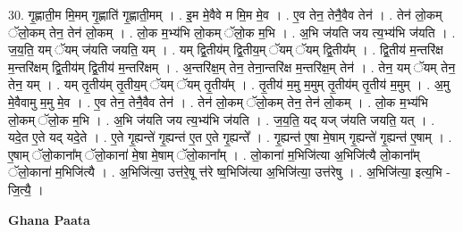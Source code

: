\documentclass[17pt]{extarticle}
\begin{document}
30. गृ॒ह्णाती॒म मि॒मम् गृ॒ह्णाति॑ गृ॒ह्णाती॒मम् । . इ॒म मे॒वैवे म मि॒म मे॒व । . ए॒व तेन॒ तेनै॒वैव तेन॑ । . तेन॑ लो॒कम् ॅलो॒कम् तेन॒ तेन॑ लो॒कम् । . लो॒क म॒भ्य॑भि लो॒कम् ॅलो॒क म॒भि । . अ॒भि ज॑यति जय त्य॒भ्य॑भि ज॑यति । . ज॒य॒ति॒ यम् ॅयम् ज॑यति जयति॒ यम् । . यम् द्वि॒तीय॑म् द्वि॒तीय॒म् ॅयम् ॅयम् द्वि॒तीय᳚म् । . द्वि॒तीय॑ म॒न्तरि॑क्ष म॒न्तरि॑क्षम् द्वि॒तीय॑म् द्वि॒तीय॑ म॒न्तरि॑क्षम् । . अ॒न्तरि॑क्ष॒म् तेन॒ तेना॒न्तरि॑क्ष म॒न्तरि॑क्ष॒म् तेन॑ । . तेन॒ यम् ॅयम् तेन॒ तेन॒ यम् । . यम् तृ॒तीय॑म् तृ॒तीय॒म् ॅयम् ॅयम् तृ॒तीय᳚म् । . तृ॒तीय॑ म॒मु म॒मुम् तृ॒तीय॑म् तृ॒तीय॑ म॒मुम् । . अ॒मु मे॒वैवामु म॒मु मे॒व । . ए॒व तेन॒ तेनै॒वैव तेन॑ । . तेन॑ लो॒कम् ॅलो॒कम् तेन॒ तेन॑ लो॒कम् । . लो॒क म॒भ्य॑भि लो॒कम् ॅलो॒क म॒भि । . अ॒भि ज॑यति जय त्य॒भ्य॑भि ज॑यति । . ज॒य॒ति॒ यद् यज् ज॑यति जयति॒ यत् । . यदे॒त ए॒ते यद् यदे॒ते । . ए॒ते गृ॒ह्यन्ते॑ गृ॒ह्यन्त॑ ए॒त ए॒ते गृ॒ह्यन्ते᳚ । . गृ॒ह्यन्त॑ ए॒षा मे॒षाम् गृ॒ह्यन्ते॑ गृ॒ह्यन्त॑ ए॒षाम् । . ए॒षाम् ॅलो॒काना᳚म् ॅलो॒काना॑ मे॒षा मे॒षाम् ॅलो॒काना᳚म् । . लो॒काना॑ म॒भिजि॑त्या अ॒भिजि॑त्यै लो॒काना᳚म् ॅलो॒काना॑ म॒भिजि॑त्यै । . अ॒भिजि॑त्या॒ उत्त॑रे॒षू त्त॑रे ष्व॒भिजि॑त्या अ॒भिजि॑त्या॒ उत्त॑रेषु । . अ॒भिजि॑त्या॒ इत्य॒भि - जि॒त्यै॒ । \newline

\textbf{Ghana Paata } \newline
\end{document}
